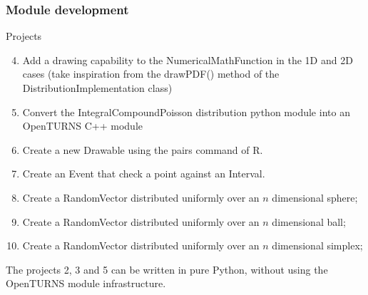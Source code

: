 \documentclass[8pt]{beamer}
\begin{document}
\begin{frame}
  \frametitle{Module development}
  \begin{block}{Projects}
    \begin{enumerate}
      \setcounter{enumi}{3}
      \item Add a drawing capability to the NumericalMathFunction in the 1D and 2D cases (take inspiration from the drawPDF() method of the DistributionImplementation class)
      \item Convert the IntegralCompoundPoisson distribution python module into an OpenTURNS C++ module
      \item Create a new Drawable using the {\ttfamily pairs} command of R.
      \item Create an Event that check a point against an Interval.
      \item Create a RandomVector distributed uniformly over an $n$ dimensional sphere;
      \item Create a RandomVector distributed uniformly over an $n$ dimensional ball;
      \item Create a RandomVector distributed uniformly over an $n$ dimensional simplex;
    \end{enumerate}
    The projects 2, 3 and 5 can be written in pure Python, without using the OpenTURNS module infrastructure.
  \end{block}
\end{frame}
\end{document}
